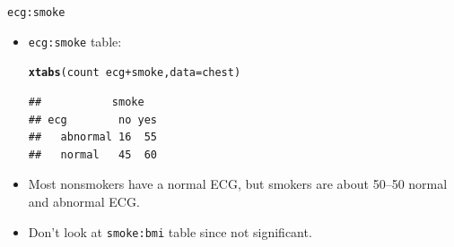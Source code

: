 \documentclass[unknownkeysallowed]{beamer}\usepackage[]{graphicx}\usepackage[]{color}
\makeatletter
\newcommand{\hlopt}[1]{\textcolor[rgb]{0,0,0}{#1}}%
\newcommand{\hlstd}[1]{\textcolor[rgb]{0.345,0.345,0.345}{#1}}%
\newcommand{\hlkwc}[1]{\textcolor[rgb]{0.333,0.667,0.333}{#1}}%
\newcommand{\hlkwd}[1]{\textcolor[rgb]{0.737,0.353,0.396}{\textbf{#1}}}%
\newenvironment{kframe}{%
 \def\at@end@of@kframe{}%
 \ifinner\ifhmode%
  \def\at@end@of@kframe{\end{minipage}}%
  \begin{minipage}{\columnwidth}%
 \fi\fi%
 \def\FrameCommand##1{\hskip\@totalleftmargin \hskip-\fboxsep
 \colorbox{shadecolor}{##1}\hskip-\fboxsep
     \hskip-\linewidth \hskip-\@totalleftmargin \hskip\columnwidth}%
 \MakeFramed {\advance\hsize-\width
   \@totalleftmargin\z@ \linewidth\hsize
   \@setminipage}}%
 {\par\unskip\endMakeFramed%
 \at@end@of@kframe}
\newenvironment{knitrout}{}{} %
\makeatother
\begin{document}
\begin{frame}[fragile]{\texttt{ecg:smoke}}
  
  \begin{itemize}
\item \texttt{ecg:smoke} table:
  
  
  
\begin{knitrout}
\color{fgcolor}\begin{kframe}
\begin{alltt}
\hlkwd{xtabs}\hlstd{(count}\hlopt{~}\hlstd{ecg}\hlopt{+}\hlstd{smoke,}\hlkwc{data}\hlstd{=chest)}
\end{alltt}
\begin{verbatim}
##           smoke
## ecg        no yes
##   abnormal 16  55
##   normal   45  60
\end{verbatim}
\end{kframe}
\end{knitrout}

\item Most nonsmokers have a normal ECG, but smokers are about 50--50
  normal and abnormal ECG.
  
  \item Don't look at \texttt{smoke:bmi} table since not significant. 
  
  \end{itemize}
  
\end{frame}
\end{document}
